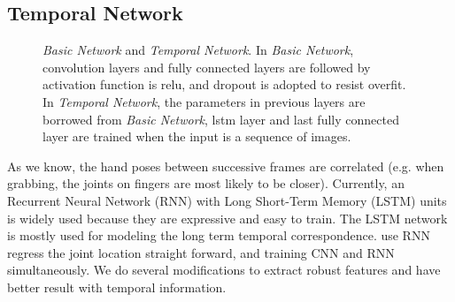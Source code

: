\documentclass[journal,comsoc]{IEEEtran}
\let\MYoriglatexcaption\caption
\renewcommand{\caption}[2][\relax]{\MYoriglatexcaption[#2]{#2}}
\begin{document}
\subsection{Temporal Network}\label{sec:temporal netowork}
\begin{figure}[t]
    \centering
\caption{\emph{Basic Network} and \emph{Temporal Network}. In \emph{Basic Network}, convolution
layers and fully connected layers are followed by activation function is relu, and dropout is
adopted to resist overfit. In \emph{Temporal Network}, the parameters in previous layers are
borrowed from \emph{Basic Network}, lstm layer and last fully connected layer are trained when
the input is a sequence of images.}
\label{fig:basic and lstm network}
\end{figure}

As we know, the hand poses between successive frames are correlated (e.g. when grabbing, the joints
on fingers are most likely to be closer). Currently, an Recurrent Neural Network (RNN) with Long
Short-Term Memory (LSTM) units~\cite{zaremba2014learning} is widely used because they are expressive
and easy to train. The LSTM network is mostly used for modeling the long term temporal correspondence.
\cite{quach2016depth} use RNN regress the joint location straight forward, and training CNN and RNN
simultaneously. We do several modifications to extract robust features and have better result with
temporal information.
\end{document}
